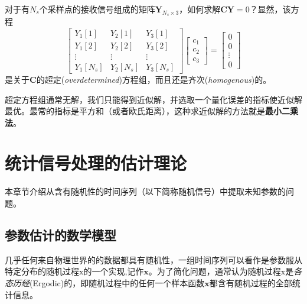     对于有$N_s$个采样点的接收信号组成的矩阵$\bm{Y}_{N_s\times 3}$，如何求解$\bm{C}\bm{Y}=0$？显然，该方程
    \begin{equation}
        \begin{bmatrix}
            Y_1[1] &Y_2[1] &Y_3[1]\\
            Y_1[2] &Y_2[2] &Y_3[2]\\
            \vdots &\vdots &\vdots\\
            Y_1[N_s] &Y_2[N_s] &Y_3[N_s]
        \end{bmatrix}
        \begin{bmatrix}
            c_1\\ c_2\\ c_3
        \end{bmatrix}
        =
        \begin{bmatrix}
            0\\
            0\\
            \vdots \\
            0
        \end{bmatrix}
    \end{equation}
    是关于$\bm{C}$的超定(\emph{overdetermined})方程组，而且还是齐次(\emph{homogenous})的。

    超定方程组通常无解，我们只能得到近似解，并选取一个量化误差的指标使近似解最优。最常的指标是平方和（或者欧氏距离），这种求近似解的方法就是\textbf{最小二乘法}。


\section{统计信号处理的估计理论}
    本章节介绍从含有随机性的时间序列（以下简称随机信号）中提取未知参数的问题。
    \subsection{参数估计的数学模型}
        几乎任何来自物理世界的的数据都具有随机性，一组时间序列可以看作是参数服从特定分布的随机过程$\bm{\mathrm{x}}$的一个实现,记作$\bm{x}$。为了简化问题，通常认为随机过程$\bm{\mathrm{x}}$是\emph{各态历经}(Ergodic)的，即随机过程中的任何一个样本函数$\bm{x}$都含有随机过程的全部统计信息。

